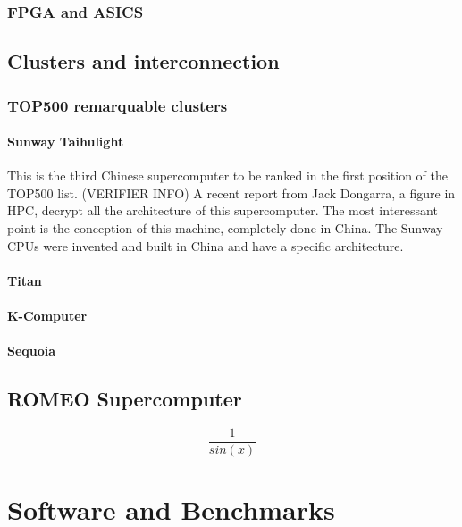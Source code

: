 \subsection{FPGA and ASICS}

\section{Clusters and interconnection}
\subsection{TOP500 remarquable clusters}
\subsubsection{Sunway Taihulight}

This is the third Chinese supercomputer to be ranked in the first position of the TOP500 list. (VERIFIER INFO)
A recent report from Jack Dongarra, a figure in HPC, decrypt all the architecture of this supercomputer\cite{dongarra2016report}. 
The most interessant point is the conception of this machine, completely done in China. 
The Sunway CPUs were invented and built in China and have a specific architecture. 


\subsubsection{Titan}
\subsubsection{K-Computer}
\subsubsection{Sequoia}
\section{ROMEO Supercomputer}

\begin{equation}
\frac{1}{sin(x)}
\end{equation}

\chapter{Software and Benchmarks}


